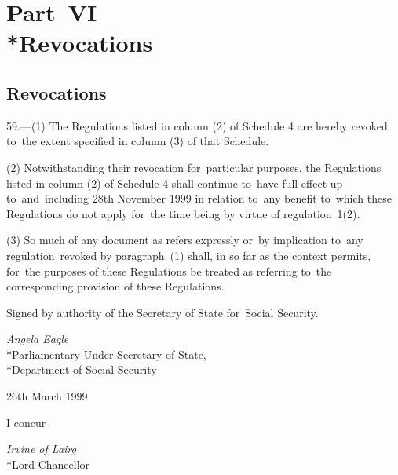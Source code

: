 \documentclass[12pt,a4paper]{article}
\begin{document}

\section[Part~VI --- Revocations]{Part~VI\\*Revocations}

\subsection[59. Revocations]{Revocations}

\renewcommand\parthead{--- Part~VI}

59.—(1) The Regulations listed in column (2) of Schedule 4 are hereby revoked to~the extent specified in column (3) of that Schedule.

(2) Notwithstanding their revocation for~particular purposes, the Regulations listed in column (2) of Schedule 4 shall continue to~have full effect up to~and~including 28th November 1999 in relation to~any benefit to~which these Regulations do not apply for~the time being by virtue of regulation~1(2).

(3) So much of any document as refers expressly or~by implication to~any regulation~revoked by paragraph~(1) shall, in so far as the context permits, for~the purposes of these Regulations be treated as referring to~the corresponding provision of these Regulations.

\bigskip

Signed 
by authority of the Secretary of State for~Social Security.

{\raggedleft
\emph{Angela Eagle}\\*Parliamentary Under-Secretary of State,\\*Department of Social Security

}

26th March 1999

\bigskip

I concur

{\raggedleft
\emph{Irvine of Lairg}\\*Lord Chancellor

}
\end{document}
